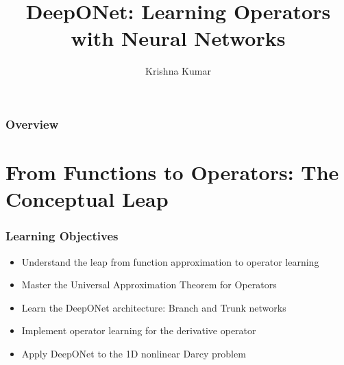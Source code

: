 \documentclass[notes]{beamer}
\title[DeepONet: Operator Learning]{DeepONet: Learning Operators with Neural Networks}
\author{Krishna Kumar} %
\institute[UT Austin] %
{
University of Texas at Austin \\
\medskip
\textit{
  \url{krishnak@utexas.edu}} %
}
\date{} %
\begin{document}
\begin{frame}
\titlepage %
\end{frame}

\begin{frame}
 \frametitle{Overview}
 \tableofcontents
\end{frame}


\section{From Functions to Operators: The Conceptual Leap}

\begin{frame}
\frametitle{Learning Objectives}

\begin{itemize}
    \item Understand the leap from function approximation to operator learning
    \item Master the Universal Approximation Theorem for Operators
    \item Learn the DeepONet architecture: Branch and Trunk networks
    \item Implement operator learning for the derivative operator
    \item Apply DeepONet to the 1D nonlinear Darcy problem
\end{itemize}

\vspace{1cm}
\centering
\href{https://colab.research.google.com/github/kks32-courses/ut-portugal-sciml/blob/main/docs/02-deeponet/deeponet.ipynb}{}

\end{frame}
\end{document}

